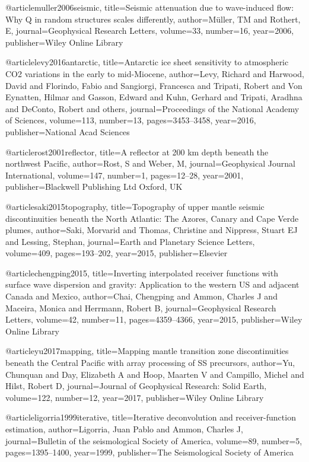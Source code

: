 @article{muller2006seismic,
  title={Seismic attenuation due to wave-induced flow: Why Q in random structures scales differently},
  author={M{\"u}ller, TM and Rothert, E},
  journal={Geophysical Research Letters},
  volume={33},
  number={16},
  year={2006},
  publisher={Wiley Online Library}
}

@article{levy2016antarctic,
  title={Antarctic ice sheet sensitivity to atmospheric CO2 variations in the early to mid-Miocene},
  author={Levy, Richard and Harwood, David and Florindo, Fabio and Sangiorgi, Francesca and Tripati, Robert and Von Eynatten, Hilmar and Gasson, Edward and Kuhn, Gerhard and Tripati, Aradhna and DeConto, Robert and others},
  journal={Proceedings of the National Academy of Sciences},
  volume={113},
  number={13},
  pages={3453--3458},
  year={2016},
  publisher={National Acad Sciences}
}



@article{rost2001reflector,
  title={A reflector at 200 km depth beneath the northwest Pacific},
  author={Rost, S and Weber, M},
  journal={Geophysical Journal International},
  volume={147},
  number={1},
  pages={12--28},
  year={2001},
  publisher={Blackwell Publishing Ltd Oxford, UK}
}

@article{saki2015topography,
  title={Topography of upper mantle seismic discontinuities beneath the North Atlantic: The Azores, Canary and Cape Verde plumes},
  author={Saki, Morvarid and Thomas, Christine and Nippress, Stuart EJ and Lessing, Stephan},
  journal={Earth and Planetary Science Letters},
  volume={409},
  pages={193--202},
  year={2015},
  publisher={Elsevier}
}

@article{chengping2015,
  title={Inverting interpolated receiver functions with surface wave dispersion and gravity: Application to the western US and adjacent Canada and Mexico},
  author={Chai, Chengping and Ammon, Charles J and Maceira, Monica and Herrmann, Robert B},
  journal={Geophysical Research Letters},
  volume={42},
  number={11},
  pages={4359--4366},
  year={2015},
  publisher={Wiley Online Library}
}

@article{yu2017mapping,
  title={Mapping mantle transition zone discontinuities beneath the Central Pacific with array processing of SS precursors},
  author={Yu, Chunquan and Day, Elizabeth A and Hoop, Maarten V and Campillo, Michel and Hilst, Robert D},
  journal={Journal of Geophysical Research: Solid Earth},
  volume={122},
  number={12},
  year={2017},
  publisher={Wiley Online Library}
}

@article{ligorria1999iterative,
  title={Iterative deconvolution and receiver-function estimation},
  author={Ligorria, Juan Pablo and Ammon, Charles J},
  journal={Bulletin of the seismological Society of America},
  volume={89},
  number={5},
  pages={1395--1400},
  year={1999},
  publisher={The Seismological Society of America}
}

